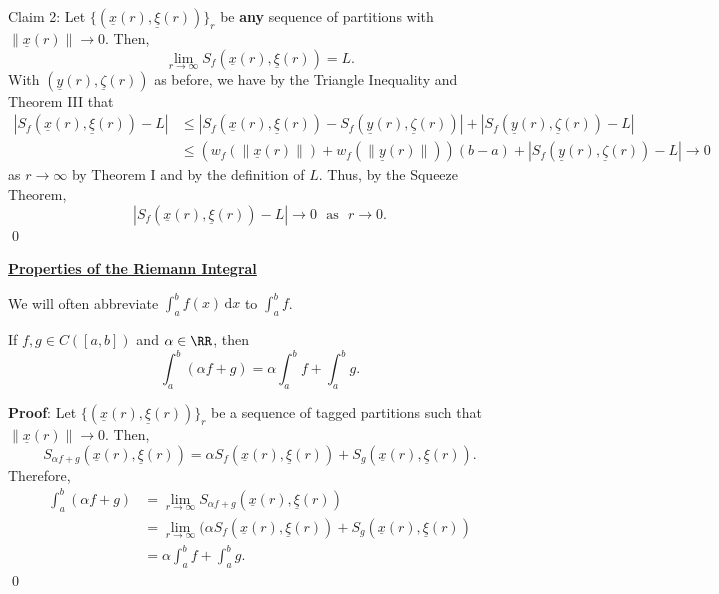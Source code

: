 Claim 2: Let $\{(\underline{x}(r), \underline{\xi}(r))\}_r$ be \textbf{any} sequence of partitions with $\lVert \underline{x}(r) \rVert \to 0$. Then, 
\[
\lim_{r\to \infty} S_f(\underline{x}(r), \underline{\xi}(r)) = L.
\]
With $(\underline{y}(r), \underline{\zeta}(r))$ as before, we have by the Triangle Inequality and Theorem III that 
\begin{align*}
    |S_f(\underline{x}(r), \underline{\xi}(r)) - L| &\leq |S_f(\underline{x}(r), \underline{\xi}(r)) - S_f(\underline{y}(r), \underline{\zeta}(r))| + |S_f(\underline{y}(r) , \underline{\zeta}(r)) - L| \\
    &\leq (w_f(\lVert \underline{x}(r)\rVert) + w_f(\lVert \underline{y}(r)\rVert))(b-a) + |S_f(\underline{y}(r), \underline{\zeta}(r)) - L|\to 0
\end{align*}
as $r\to \infty$ by Theorem I and by the definition of $L$. Thus, by the Squeeze Theorem, 
\[
|S_f(\underline{x}(r),\underline{\xi}(r)) - L| \to 0 \text{~~as~~} r\to 0.
\]\qed 

\noindent\underline{\textbf{Properties of the Riemann Integral}}

\begin{notation}
We will often abbreviate $\int_a^b f(x) \,\mathrm dx$ to $\int_a^b f$.
\end{notation}

\begin{theorem}[Linearity]
If $f,g\in C([a,b])$ and $\alpha \in \RR$, then 
\[
\int_a^b (\alpha f + g) = \alpha \int_a^b f + \int_a^b g.
\]
\end{theorem}
\textbf{Proof}: Let $\{(\underline{x}(r),\underline{\xi}(r))\}_r$ be a sequence of tagged partitions such that $\lVert \underline{x}(r)\rVert \to 0$. Then, 
\[
S_{\alpha f+g}(\underline{x}(r), \underline{\xi}(r)) = \alpha S_f(\underline{x}(r), \underline{\xi}(r)) + S_g(\underline{x}(r),\underline{\xi}(r)).
\]
Therefore, 
\begin{align*}
    \int_a^b (\alpha f + g) &= \lim_{r\to \infty} S_{\alpha f + g} (\underline{x}(r),\underline{\xi}(r)) \\
    &= \lim_{r\to \infty} (\alpha S_f(\underline{x}(r), \underline{\xi}(r)) + S_g(\underline{x}(r),\underline{\xi}(r)) \\
    &= \alpha \int_a^b f + \int_a^b g.
\end{align*}
\qed 


